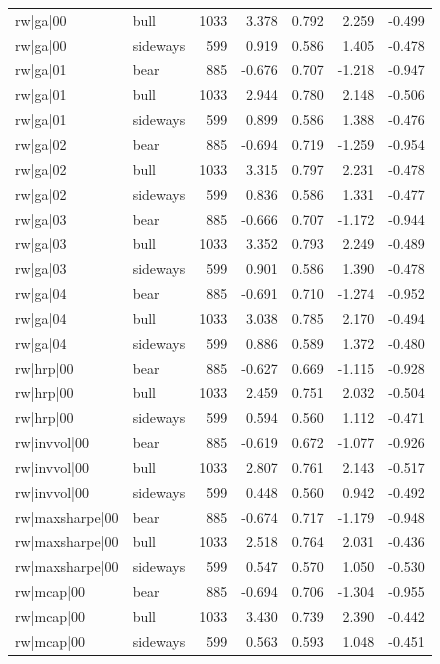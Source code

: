 \begin{table}
\begin{tabular}{llrrrrr}
rw|ga|00 & bull & 1033 & 3.378 & 0.792 & 2.259 & -0.499 \\
rw|ga|00 & sideways & 599 & 0.919 & 0.586 & 1.405 & -0.478 \\
rw|ga|01 & bear & 885 & -0.676 & 0.707 & -1.218 & -0.947 \\
rw|ga|01 & bull & 1033 & 2.944 & 0.780 & 2.148 & -0.506 \\
rw|ga|01 & sideways & 599 & 0.899 & 0.586 & 1.388 & -0.476 \\
rw|ga|02 & bear & 885 & -0.694 & 0.719 & -1.259 & -0.954 \\
rw|ga|02 & bull & 1033 & 3.315 & 0.797 & 2.231 & -0.478 \\
rw|ga|02 & sideways & 599 & 0.836 & 0.586 & 1.331 & -0.477 \\
rw|ga|03 & bear & 885 & -0.666 & 0.707 & -1.172 & -0.944 \\
rw|ga|03 & bull & 1033 & 3.352 & 0.793 & 2.249 & -0.489 \\
rw|ga|03 & sideways & 599 & 0.901 & 0.586 & 1.390 & -0.478 \\
rw|ga|04 & bear & 885 & -0.691 & 0.710 & -1.274 & -0.952 \\
rw|ga|04 & bull & 1033 & 3.038 & 0.785 & 2.170 & -0.494 \\
rw|ga|04 & sideways & 599 & 0.886 & 0.589 & 1.372 & -0.480 \\
rw|hrp|00 & bear & 885 & -0.627 & 0.669 & -1.115 & -0.928 \\
rw|hrp|00 & bull & 1033 & 2.459 & 0.751 & 2.032 & -0.504 \\
rw|hrp|00 & sideways & 599 & 0.594 & 0.560 & 1.112 & -0.471 \\
rw|invvol|00 & bear & 885 & -0.619 & 0.672 & -1.077 & -0.926 \\
rw|invvol|00 & bull & 1033 & 2.807 & 0.761 & 2.143 & -0.517 \\
rw|invvol|00 & sideways & 599 & 0.448 & 0.560 & 0.942 & -0.492 \\
rw|maxsharpe|00 & bear & 885 & -0.674 & 0.717 & -1.179 & -0.948 \\
rw|maxsharpe|00 & bull & 1033 & 2.518 & 0.764 & 2.031 & -0.436 \\
rw|maxsharpe|00 & sideways & 599 & 0.547 & 0.570 & 1.050 & -0.530 \\
rw|mcap|00 & bear & 885 & -0.694 & 0.706 & -1.304 & -0.955 \\
rw|mcap|00 & bull & 1033 & 3.430 & 0.739 & 2.390 & -0.442 \\
rw|mcap|00 & sideways & 599 & 0.563 & 0.593 & 1.048 & -0.451 \\

\end{tabular}
\end{table}
